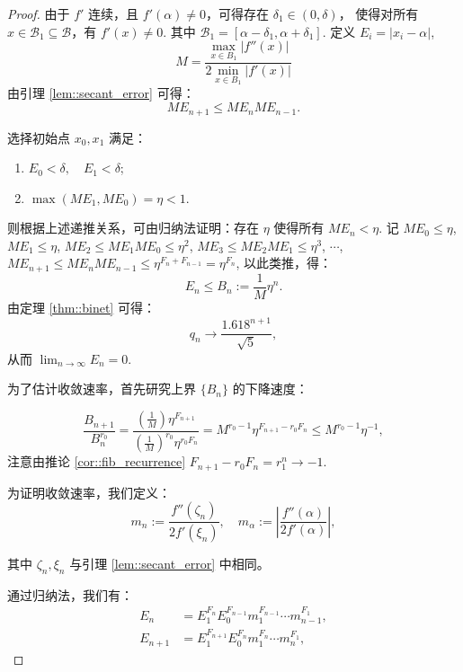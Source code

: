 \documentclass[a4paper]{ctexart}
\numberwithin{theorem}{section}
\numberwithin{equation}{section}
\numberwithin{figure}{section}
\numberwithin{remark}{section}
\begin{document}
\begin{proof}
由于 \( f' \) 连续，且 \( f'(\alpha) \ne 0 \)，可得存在 \( \delta_1 \in (0, \delta) \)，
使得对所有 \( x \in \mathcal{B}_1 \subseteq \mathcal{B} \)，有 \( f'(x) \ne 0 \).
其中 \( \mathcal{B}_1 = [\alpha - \delta_1, \alpha + \delta_1] \). 
定义 \( E_i = |x_i - \alpha| \),
\[
M = \frac{\displaystyle \max_{x \in B_1} |f''(x)|}{\displaystyle 2 \min_{x \in B_1} |f'(x)|}
\]
由引理 \ref{lem::secant_error} 可得：
\begin{equation*}
ME_{n+1} \leq ME_n ME_{n-1}.
\end{equation*}

选择初始点 \(x_0, x_1\) 满足：

\begin{enumerate}
    \item \( E_0 < \delta, \quad E_1 < \delta \);
    \item \( \max(ME_1, ME_0) = \eta < 1 \).
\end{enumerate}

则根据上述递推关系，可由归纳法证明：存在 \(\eta\) 使得所有 \( ME_n < \eta \). 记 \( ME_0 \leq \eta \),
 \( ME_1 \leq \eta \), 
 \( ME_2 \leq ME_1 ME_0 \leq \eta^2 \), 
 \( ME_3 \leq ME_2 ME_1 \leq \eta^3 \), $\cdots$, 
 \( ME_{n + 1} \leq ME_n ME_{n - 1} \leq \eta^{F_n + F_{n - 1}} = \eta^{F_n} \), 
 以此类推，得：
\[
E_n \leq B_n := \frac{1}{M} \eta^n.
\]
由定理 \ref{thm::binet} 可得：
\[
q_n \to \frac{1.618^{n+1}}{\sqrt{5}},
\]
从而 \( \lim_{n \to \infty} E_n = 0 \).

为了估计收敛速率，首先研究上界 \( \{B_n\} \) 的下降速度：

\begin{equation*}
\frac{B_{n+1}}{B^{r_0}_n} = \frac{\left(\frac{1}{M}\right)\eta^{F_{n+1}}}{\left(\frac{1}{M}\right)^{r_0}\eta^{r_0F_{n}}} 
= M^{r_0 - 1} \eta^{F_{n + 1} - r_0 F_n} \leq M^{r_0 - 1} \eta^{-1},
\end{equation*}
注意由推论 \ref{cor::fib_recurrence}  \( F_{n+1} - r_0 F_n = r_1^{n} \to -1 \). 

为证明收敛速率，我们定义：
\begin{equation}
m_n := \frac{f''(\zeta_n)}{2f'(\xi_n)}, \quad m_\alpha := \left| \frac{f''(\alpha)}{2f'(\alpha)} \right|,
\end{equation}

其中 \( \zeta_n, \xi_n \) 与引理 \ref{lem::secant_error} 中相同。

通过归纳法，我们有：
\begin{align*}
E_n &= E_1^{{F_n}} E_0^{{F_{n-1}}} m_1^{F_{n-1}} \cdots m_{n-1}^{F_1}, \\
E_{n+1} &= E_1^{F_{n+1}} E_0^{F_n} m_1^{F_n} \cdots m_n^{F_1},
\end{align*}


\end{proof}
\end{document}
